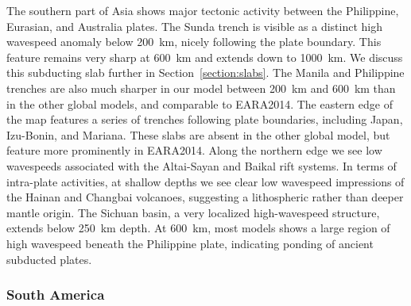 \documentclass[extra,mreferee]{gji}
\begin{document}
The southern part of Asia shows major tectonic activity between the
Philippine, Eurasian, and Australia plates.
The Sunda trench is visible as a distinct high wavespeed anomaly below 200~km,
nicely following the plate boundary.
This feature remains very sharp at 600~km and extends
down to 1000~km.
We discuss this subducting slab further in Section~\ref{section:slabs}.
The Manila and Philippine trenches are also much sharper in our model between 200~km and
600~km than in the other global models, and comparable to EARA2014.
The eastern edge of the map features a series of trenches following plate boundaries,
including Japan, Izu-Bonin, and Mariana.
These slabs are absent in the other global model,
but feature more prominently in EARA2014.
Along the northern edge we see low wavespeeds associated with the
Altai-Sayan and Baikal rift systems.
In terms of intra-plate activities,
at shallow depths we see clear low wavespeed impressions of the Hainan and Changbai volcanoes,
suggesting a lithospheric rather than deeper mantle origin.
The Sichuan basin, a very localized high-wavespeed structure, extends below
250~km depth. At 600~km, most models shows a large region of high wavespeed
beneath the Philippine plate, indicating ponding of ancient subducted plates.

\subsubsection{South America}
\end{document}
